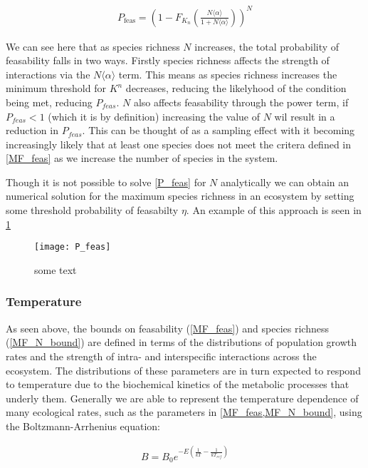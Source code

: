 \documentclass{article}
\begin{document}
\begin{align}
  P_{\text{feas}} = \left( 1 - F_{K_n}\left(\frac{N \langle \alpha \rangle}{1 + N \langle \alpha \rangle }\right) \right)^N \label{P_feas}
\end{align}

We can see here that as species richness $N$ increases, the total probability of feasability falls in two ways. Firstly species richness affects the strength of interactions via the $N \langle \alpha \rangle$ term. This means as species richness increases the minimum threshold for $K^n$ decreases, reducing the likelyhood of the condition being met, reducing $P_{feas}$. $N$ also affects feasability through the power term, if $P_{feas} < 1$ (which it is by definition) increasing the value of $N$ wil result in a reduction in $P_{feas}$. This can be thought of as a sampling effect with it becoming increasingly likely that at least one species does not meet the critera defined in \cref{MF_feas} as we increase the number of species in the system.

Though it is not possible to solve \cref{P_feas} for $N$ analytically we can obtain an numerical solution for the maximum species richness in an ecosystem by setting some threshold probability of feasabilty $\eta$. An example of this approach is seen in \cref{P_feas_fig}

\begin{figure}
  \texttt{[image: P\_feas]}
  \centering
  \caption{some text}
  \label{P_feas_fig}
\end{figure}


\subsubsection{Temperature}
As seen above, the bounds on feasability (\cref{MF_feas}) and species richness (\cref{MF_N_bound}) are defined in terms of the distributions of population growth rates and the strength of intra- and interspecific interactions across the ecosystem. The distributions of these parameters are in turn expected to respond to temperature due to the biochemical kinetics of the metabolic processes that underly them. Generally we are able to represent the temperature dependence of many ecological rates, such as the parameters in \cref{MF_feas,MF_N_bound}, using the Boltzmann-Arrhenius equation:

\begin{align}
  B = B_0 e^{-E \left(\frac{1}{k T} - \frac{1}{k T_{ref}} \right) }   \label{boltz}
\end{align}
\end{document}
